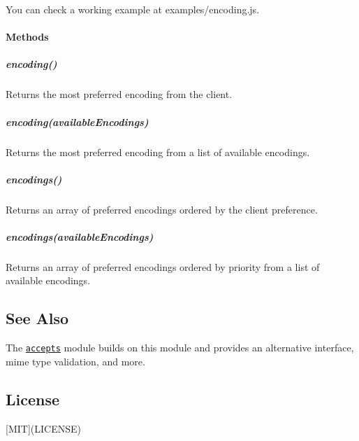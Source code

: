 You can check a working example at {\ttfamily examples/encoding.\+js}.

\paragraph*{Methods}

\subparagraph*{encoding()}

Returns the most preferred encoding from the client.

\subparagraph*{encoding(available\+Encodings)}

Returns the most preferred encoding from a list of available encodings.

\subparagraph*{encodings()}

Returns an array of preferred encodings ordered by the client preference.

\subparagraph*{encodings(available\+Encodings)}

Returns an array of preferred encodings ordered by priority from a list of available encodings.

\subsection*{See Also}

The \href{https://npmjs.org/package/accepts#readme}{\tt accepts} module builds on this module and provides an alternative interface, mime type validation, and more.

\subsection*{License}

\mbox{[}M\+IT\mbox{]}(L\+I\+C\+E\+N\+SE) 